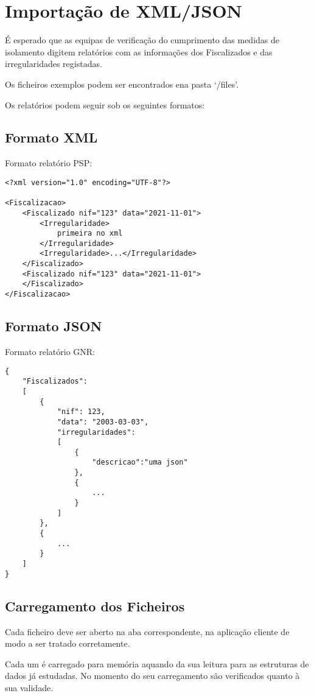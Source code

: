 \chapter{Importação de XML/JSON}

É esperado que as equipas de verificação do cumprimento das medidas de isolamento digitem relatórios com as informações dos Fiscalizados e das irregularidades registadas.

Os ficheiros exemplos podem ser encontrados ena pasta `/files'.

Os relatórios podem seguir sob os seguintes formatos:
\section{Formato XML}
Formato relatório PSP:

\begin{lstlisting}
<?xml version="1.0" encoding="UTF-8"?>

<Fiscalizacao>
    <Fiscalizado nif="123" data="2021-11-01">
        <Irregularidade>
            primeira no xml
        </Irregularidade>
        <Irregularidade>...</Irregularidade>
    </Fiscalizado>
    <Fiscalizado nif="123" data="2021-11-01">
    </Fiscalizado>
</Fiscalizacao>
\end{lstlisting}

\vfill

\section{Formato JSON}
Formato relatório GNR:

\begin{lstlisting}
{
    "Fiscalizados":
    [
        {
            "nif": 123,
            "data": "2003-03-03",
            "irregularidades":
            [
                {
                    "descricao":"uma json"
                },
                {
                    ...
                }
            ]
        },
        {
            ...
        }
    ]
}
\end{lstlisting}

\section{Carregamento dos Ficheiros}

Cada ficheiro deve ser aberto na aba correspondente, na aplicação cliente de modo a ser tratado corretamente.

Cada um é carregado para memória aquando da sua leitura para as estruturas de dados já estudadas.
No momento do seu carregamento são verificados quanto à sua validade.